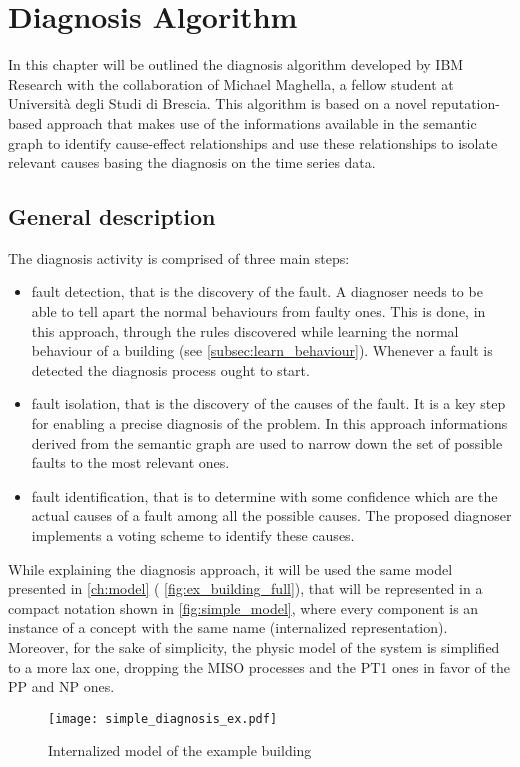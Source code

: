 \chapter{Diagnosis Algorithm} \label{ch:diagnosis}
In this chapter will be outlined the diagnosis algorithm\cite{semantic_diagnoser} developed by IBM Research with the collaboration of Michael Maghella, a fellow student at Università degli Studi di Brescia. This algorithm is based on a novel reputation-based approach that makes use of the informations available in the semantic graph to identify cause-effect relationships and use these relationships to isolate relevant causes basing the diagnosis on the time series data.
\section{General description}
The diagnosis activity is comprised of three main steps:
\begin{itemize}
  \item fault detection, that is the discovery of the fault. A diagnoser needs to be able to tell apart the normal behaviours from faulty ones. This is done, in this approach, through the rules discovered while learning the normal behaviour of a building (see \autoref{subsec:learn_behaviour}). Whenever a fault is detected the diagnosis process ought to start.
  \item fault isolation, that is the discovery of the causes of the fault. It is a key step for enabling a precise diagnosis of the problem. In this approach informations derived from the semantic graph are used to narrow down the set of possible faults to the most relevant ones.
  \item fault identification, that is to determine with some confidence which are the actual causes of a fault among all the possible causes. The proposed diagnoser implements a voting scheme to identify these causes.
\end{itemize}
While explaining the diagnosis approach, it will be used the same model presented in \autoref{ch:model} ( \autoref{fig:ex_building_full}), that will be represented in a compact notation shown in \autoref{fig:simple_model}, where every component is an instance of a concept with the same name (internalized representation). Moreover, for the sake of simplicity, the physic model of the system is simplified to a more lax one, dropping the MISO processes and the PT1 ones in favor of the PP and NP ones.
\begin{figure}
  \texttt{[image: simple\_diagnosis\_ex.pdf]}
  \caption{Internalized model of the example building}
  \label{fig:simple_model}
\end{figure}
